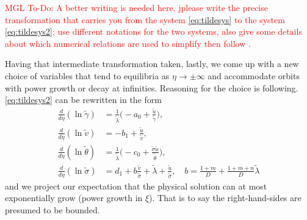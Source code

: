 \documentclass[a4paper,11pt]{article}
\def\tg{{\tilde{\gamma}}}
\def\tv{{\tilde{v}}}
\def\tth{{\tilde{\theta}}}
\def\ts{{\tilde{\sigma}}}
\def\tu{{\tilde{u}}}
\newcommand{\tcr}{\textcolor{red}}
\theoremstyle{remark}
\begin{document}
\noindent
\tcr{MGL To-Do:    A better writing is needed here, jplease write the precise transformation that carries you
 from the system \eqref{eq:tildesys} to the system \eqref{eq:tildesys2}; use different notations for the two systems, 
 also give some details about which
 numerical relations are used to simplify then follow \cite{LKT17}. }

Having that intermediate transformation taken, lastly, we come up with a new choice of variables that tend to equilibria as $\eta \rightarrow \pm \infty$ and accommodate
orbits with power growth or decay at infinities. Reasoning for the choice is following. \eqref{eq:tildesys2} can be rewritten in the form
\begin{equation}
 \label{eq:tildesys3}
\begin{aligned}
\frac{d}{d\eta}{(\ln{\tg})}  &=  \tfrac{1}{\tilde\lambda} \big (- a_0 +  \frac{\tu}{\tg} \big ),
\\
\frac{d}{d\eta}{(\ln{\tv})}  &=  - b_1 + \frac{\tu}{\tv} ,
\\
\frac{d}{d\eta}{(\ln{\tth})} &=   \tfrac{1}{\tilde\lambda} \big (- c_0 +  \frac{\ts \tu}{\tth} \big ),
\\
\frac{d}{d\eta}{(\ln{\ts})} &= d_1 + b \frac{\tv}{\ts} + \tilde\lambda + \frac{\tu}{\ts}, \quad b = \frac{1+m}{D} + \frac{1+m+n}{D}\tilde\lambda
\end{aligned}
\end{equation}
and we project our expectation that the physical solution can at most exponentially grow (power growth in $\xi$). That is to say the right-hand-sides are presumed to be bounded. 
\end{document}
